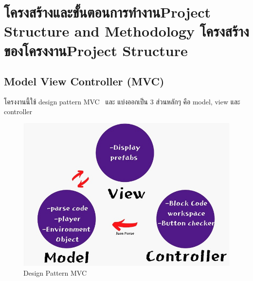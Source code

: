 \chapter{\ifproject%
\ifcpe โครงสร้างและขั้นตอนการทำงาน\else Project Structure and Methodology\fi
\else%
\ifcpe โครงสร้างของโครงงาน\else Project Structure\fi
\fi
}


\makeatletter


\makeatother

\section{Model View Controller (MVC)}
โครงงานนี้ใช้ design pattern MVC~\cite{mvc} และ แบ่งออกเป็น 3 ส่วนหลักๆ คือ model, view และ controller
\begin{figure}
\begin{center}
\includegraphics{pic/pic1.jpg}
\end{center}
\caption[Poem]{Design Pattern MVC}
\label{fig:walrus}
\end{figure}

